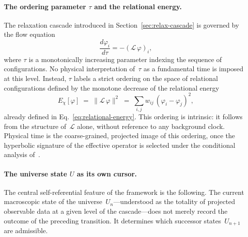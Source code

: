   \paragraph{The ordering parameter $\tau$ and the relational energy.}
    The relaxation cascade introduced in Section~\ref{sec:relax-cascade}
    is governed by the flow equation
    \begin{equation}
      \frac{d\varphi_i}{d\tau} = -(\mathcal{L}\,\varphi)_i,
    \end{equation}
    where $\tau$ is a monotonically increasing parameter indexing the sequence
    of configurations.
    No physical interpretation of~$\tau$ as a fundamental time is imposed at this level.
    Instead, $\tau$ labels a strict ordering on the space of relational configurations
    defined by the monotone decrease of the relational energy
    \begin{equation}
      E_\chi[\varphi] \;=\; \|\mathcal{L}\,\varphi\|^2
      \;=\; \sum_{i,j} w_{ij}\,(\varphi_i - \varphi_j)^2,
    \end{equation}
    already defined in Eq.~\eqref{eq:relational-energy}.
    This ordering is intrinsic: it follows from the structure of~$\mathcal{L}$ alone,
    without reference to any background clock.
    Physical time is the coarse-grained, projected image of this ordering,
    once the hyperbolic signature of the effective operator is selected under
    the conditional analysis of~\cite{Beau2026c}.

  \paragraph{The universe state $U$ as its own cursor.}
    The central self-referential feature of the framework is the following.
    The current macroscopic state of the universe~$U_n$---understood as the totality
    of projected observable data at a given level of the cascade---does not merely
    record the outcome of the preceding transition.
    It determines which successor states~$U_{n+1}$ are admissible.

